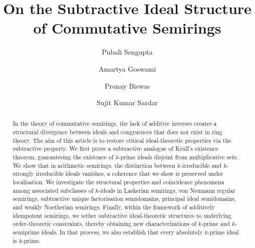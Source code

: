\documentclass[11pt,leqno]{amsart}
\theoremstyle{definition}
\numberwithin{equation}{section}
\begin{document}
\author{Pubali Sengupta}
\address{
	Department of Mathematics, Jadavpur University, 188, Raja Subodh Chandra Mallick Rd,
	Jadavpur, Kolkata, West Bengal 700032, India.}
	
\author{Amartya Goswami}
\address{[1]  Department of Mathematics and Applied Mathematics, University of Johannesburg, P.O. Box 524, Auckland Park 2006, South Africa. [2]  National Institute for Theoretical and Computational Sciences (NITheCS), South Africa.}

\author{Pronay Biswas}

\address{Department of Mathematics, Jadavpur University, 188, Raja Subodh Chandra Mallick Rd,
	Jadavpur, Kolkata, West Bengal 700032, India}
	
\author{Sujit Kumar Sardar}
\address{Department of Mathematics, Jadavpur University, 188, Raja Subodh Chandra Mallick Rd,
Jadavpur, Kolkata, West Bengal 700032, India.}
	
\title{On the Subtractive Ideal Structure of Commutative Semirings}

\date{}




\begin{abstract}
In the theory of commutative semirings, the lack of additive inverses creates a structural divergence between ideals and congruences that does not exist in ring theory. The aim of this article is to  restore critical ideal-theoretic properties via the subtractive property. We first prove a subtractive analogue of Krull’s existence theorem, guaranteeing the existence of $k$-prime ideals disjoint from multiplicative sets. We show that in arithmetic semirings, the distinction between $k$-irreducible and $k$-strongly irreducible ideals vanishes, a coherence that we show is preserved under localisation. We investigate the structural properties and coincidence phenomena among associated subclasses of $k$-ideals in Laskerian semirings, von Neumann regular semirings, subtractive unique factorisation semidomains, principal ideal semidomains, and weakly Noetherian semirings. 
Finally, within the framework of additively idempotent semirings, we tether subtractive ideal-theoretic structures to underlying order-theoretic constraints, thereby obtaining new characterizations of $k$-prime and $k$-semiprime ideals. In that process, we also establish that every absolutely $k$-prime ideal is $k$-prime.
\end{abstract}
\maketitle
\tableofcontents 
\end{document}
